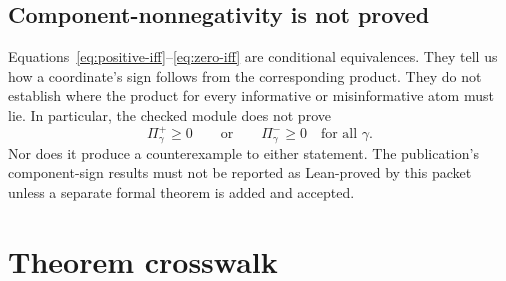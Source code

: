\documentclass[11pt]{article}
\theoremstyle{definition}
\begin{document}
\subsection{Component-nonnegativity is not proved}

Equations~\eqref{eq:positive-iff}--\eqref{eq:zero-iff} are conditional equivalences.  They tell us
how a coordinate's sign follows from the corresponding product.  They do not establish where the
product for every informative or misinformative atom must lie.  In particular, the checked module does
not prove
\[
\Pi^+_\gamma\ge0
\qquad\text{or}\qquad
\Pi^-_\gamma\ge0
\quad\text{for all }\gamma.
\]
Nor does it produce a counterexample to either statement.  The publication's component-sign
results must not be reported as Lean-proved by this packet unless a separate formal theorem is
added and accepted.

\section{Theorem crosswalk}
\end{document}
